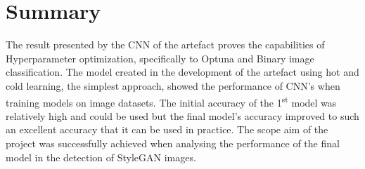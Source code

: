 \section{Summary}

The result presented by the CNN of the artefact proves the capabilities of Hyperparameter optimization, specifically to Optuna and Binary image classification. The model created in the development of the artefact using hot and cold learning, the simplest approach, showed the performance of CNN's when training models on image datasets. The initial accuracy of the 1\textsuperscript{st} model was relatively high and could be used but the final model's accuracy improved to such an excellent accuracy that it can be used in practice. The scope aim of the project was successfully achieved when analysing the performance of the final model in the detection of StyleGAN images.
